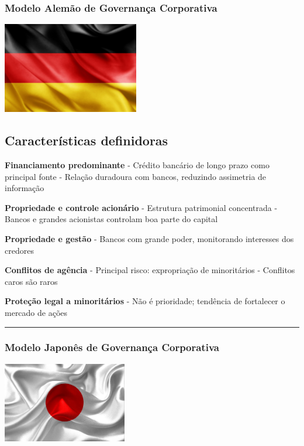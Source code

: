 \documentclass[
]{book}
\begin{document}
\subsubsection{Modelo Alemão de Governança Corporativa}\label{modelo-alemuxe3o-de-governanuxe7a-corporativa}

\includegraphics[width=2.34375in,height=\textheight]{images/02-2025-08-12_13/07-modelo_alemao.jpg}

\subsection{Características definidoras}\label{caracteruxedsticas-definidoras-1}

\textbf{Financiamento predominante} - Crédito bancário de longo prazo como principal fonte - Relação duradoura com bancos, reduzindo assimetria de informação

\textbf{Propriedade e controle acionário} - Estrutura patrimonial concentrada - Bancos e grandes acionistas controlam boa parte do capital

\textbf{Propriedade e gestão} - Bancos com grande poder, monitorando interesses dos credores

\textbf{Conflitos de agência} - Principal risco: expropriação de minoritários - Conflitos caros são raros

\textbf{Proteção legal a minoritários} - Não é prioridade; tendência de fortalecer o mercado de ações

\begin{center}\rule{0.5\linewidth}{0.5pt}\end{center}

\subsubsection{Modelo Japonês de Governança Corporativa}\label{modelo-japonuxeas-de-governanuxe7a-corporativa}

\includegraphics[width=2.13542in,height=\textheight]{images/02-2025-08-12_13/09-modelo_japones.jpg}
\end{document}
